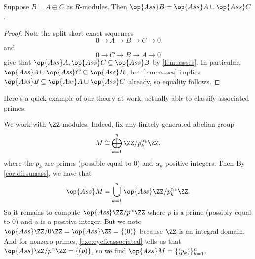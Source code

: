 \begin{corollary} \label{cor:dirsumass}
	Suppose $B=A\oplus C$ as $R$-modules. Then $\op{Ass}B=\op{Ass}A\cup\op{Ass}C$.
\end{corollary}
\begin{proof}
	Note the split short exact sequences
	\[0\to A\to B\to C\to 0\]
	and
	\[0\to C\to B\to A\to 0\]
	give that $\op{Ass}A,\op{Ass}C\subseteq\op{Ass}B$ by \autoref{lem:assses}. In particular, $\op{Ass}A\cup\op{Ass}C\subseteq\op{Ass}B$, but \autoref{lem:assses} implies $\op{Ass}B\subseteq\op{Ass}A\cup\op{Ass}C$ already, so equality follows.
\end{proof}
Here's a quick example of our theory at work, actually able to classify associated primes.
\begin{ex}
	We work with $\ZZ$-modules. Indeed, fix any finitely generated abelian group
	\[M\cong\bigoplus_{k=1}^n\ZZ/p_k^{\alpha_k}\ZZ,\]
	where the $p_k$ are primes (possible equal to $0$) and $\alpha_k$ positive integers. Then By \autoref{cor:dirsumass}, we have that
	\[\op{Ass}M=\bigcup_{k=1}^n\op{Ass}\ZZ/p_k^{\alpha_k}\ZZ.\]
	So it remains to compute $\op{Ass}\ZZ/p^\alpha\ZZ$ where $p$ is a prime (possibly equal to $0$) and $\alpha$ is a positive integer. But we note $\op{Ass}\ZZ/0\ZZ=\op{Ass}\ZZ=\{(0)\}$ because $\ZZ$ is an integral domain. And for nonzero primes, \autoref{exe:cyclicassociated} tells us that $\op{Ass}\ZZ/p^\alpha\ZZ=\{(p)\}$, so we find $\op{Ass}M=\{(p_k)\}_{k=1}^n$.
\end{ex}

